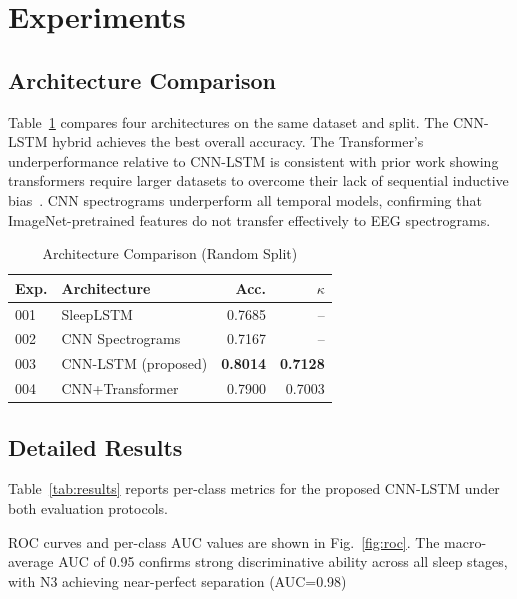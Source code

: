 \documentclass[journal]{IEEEtran}
\begin{document}
\section{Experiments}
\label{sec:experiments}

\subsection{Architecture Comparison}

Table~\ref{tab:architectures} compares four
architectures on the same dataset and split.
The CNN-LSTM hybrid achieves the best overall
accuracy.
The Transformer's underperformance relative to
CNN-LSTM is consistent with prior work showing
transformers require larger datasets to overcome
their lack of sequential inductive
bias~\cite{zeng2023}.
CNN spectrograms underperform all temporal models,
confirming that ImageNet-pretrained features do
not transfer effectively to EEG spectrograms.

\begin{table}[h]
\caption{Architecture Comparison (Random Split)}
\label{tab:architectures}
\centering
\begin{tabular}{llrr}
\toprule
Exp. & Architecture & Acc. & $\kappa$ \\
\midrule
001  & SleepLSTM            & 0.7685 & --   \\
002  & CNN Spectrograms     & 0.7167 & --   \\
003  & CNN-LSTM (proposed)  & \textbf{0.8014} & \textbf{0.7128} \\
004  & CNN+Transformer      & 0.7900 & 0.7003   \\
\bottomrule
\end{tabular}
\end{table}

\subsection{Detailed Results}

Table~\ref{tab:results} reports per-class metrics
for the proposed CNN-LSTM under both evaluation
protocols.

ROC curves and per-class AUC values are shown in 
Fig.~\ref{fig:roc}. The macro-average AUC of 0.95 
confirms strong discriminative ability across all 
sleep stages, with N3 achieving near-perfect 
separation (AUC=0.98)
\end{document}
